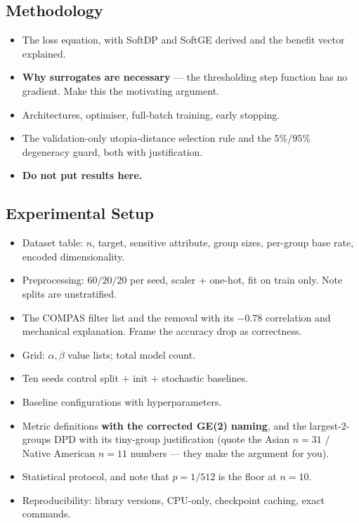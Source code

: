 \subsection{Methodology}
\begin{itemize}
\item The loss equation, with SoftDP and SoftGE derived and the benefit vector
explained.
\item \textbf{Why surrogates are necessary} --- the thresholding step function
has no gradient. Make this the motivating argument.
\item Architectures, optimiser, full-batch training, early stopping.
\item The validation-only utopia-distance selection rule and the $5\%$/$95\%$
degeneracy guard, both with justification.
\item \textbf{Do not put results here.}
\end{itemize}

\subsection{Experimental Setup}
\begin{itemize}
\item Dataset table: $n$, target, sensitive attribute, group sizes, per-group
base rate, encoded dimensionality.
\item Preprocessing: $60/20/20$ per seed, scaler + one-hot, fit on train only.
Note splits are unstratified.
\item The COMPAS filter list and the  removal with its $-0.78$
correlation and mechanical explanation. Frame the accuracy drop as correctness.
\item Grid: $\alpha,\beta$ value lists; total model count.
\item Ten seeds control split $+$ init $+$ stochastic baselines.
\item Baseline configurations with hyperparameters.
\item Metric definitions \textbf{with the corrected GE(2) naming}, and the
largest-2-groups DPD with its tiny-group justification (quote the Asian $n=31$ /
Native American $n=11$ numbers --- they make the argument for you).
\item Statistical protocol, and note that $p = 1/512$ is the floor at $n=10$.
\item Reproducibility: library versions, CPU-only, checkpoint caching, exact
commands.
\end{itemize}

